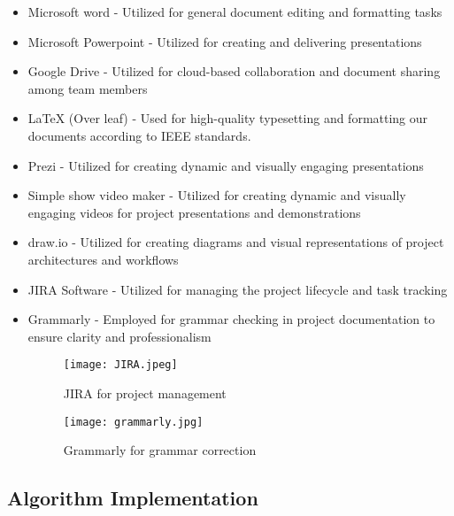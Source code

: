 \documentclass[conference]{IEEEtran}
\begin{document}
\begin{itemize}
\item Microsoft word - Utilized for general document editing and formatting tasks
\item Microsoft Powerpoint - Utilized for creating and delivering presentations
\item Google Drive - Utilized for cloud-based collaboration and document sharing among team members
\item LaTeX (Over leaf) - Used for high-quality typesetting and formatting our documents according to IEEE standards.
\item Prezi - Utilized for creating dynamic and visually engaging presentations
\item Simple show video maker - Utilized for creating dynamic and visually engaging videos for project presentations and demonstrations
\item draw.io - Utilized for creating diagrams and visual representations of project architectures and workflows
\item JIRA Software -  Utilized for managing the project lifecycle and task tracking
\item Grammarly - Employed for grammar checking in project documentation to ensure clarity and professionalism

\begin{figure}[htbp]
\centerline{\texttt{[image: JIRA.jpeg]}}
\caption{JIRA for project management}
\label{fig}
\end{figure}

\begin{figure}[htbp]
\centerline{\texttt{[image: grammarly.jpg]}}
\caption{Grammarly for grammar correction}
\label{fig}
\end{figure}


\end{itemize}



\subsection{Algorithm Implementation}
\end{document}
